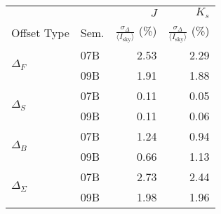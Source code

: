 \begin{tabular}{ll|rr}
&  & $J$ & $K_s$ \\ %
Offset Type & Sem. & $\frac{\sigma_\Delta}{\langle I_\mathrm{sky}\rangle }$ (\%) & $\frac{\sigma_\Delta}{\langle I_\mathrm{sky}\rangle }$ (\%) \\
\hline
\multirow{2}{*}{$\Delta_F$} & 07B & 2.53 & 2.29 \\
& 09B  & 1.91 & 1.88 \\
\hline
\multirow{2}{*}{$\Delta_S$} & 07B & 0.11 & 0.05 \\
& 09B & 0.11 & 0.06 \\
\hline
\multirow{2}{*}{$\Delta_B$} & 07B & 1.24 & 0.94 \\
& 09B & 0.66 & 1.13 \\
\hline
\multirow{2}{*}{$\Delta_\Sigma$} & 07B & 2.73 & 2.44 \\
& 09B & 1.98 & 1.96 \\
\end{tabular}
